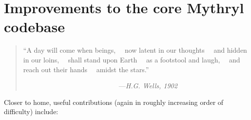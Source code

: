 \section{Improvements to the core Mythryl codebase}

\begin{quotation}\begin{tiny}
           ``A day will come when beings,\newline
           ~~now latent in our thoughts\newline
           ~~and hidden in our loins,\newline
           ~~shall stand upon Earth\newline
           ~~as a footstool and laugh,\newline
           ~~and reach out their hands\newline
           ~~amidst the stars.''\newline

            ~~~~~~~~~~~~~~~~~~~~~~~~~~~~---{\em H.G. Wells, 1902}
\end{tiny}\end{quotation}


Closer to home, useful contributions (again in roughly increasing 
order of difficulty) include:

